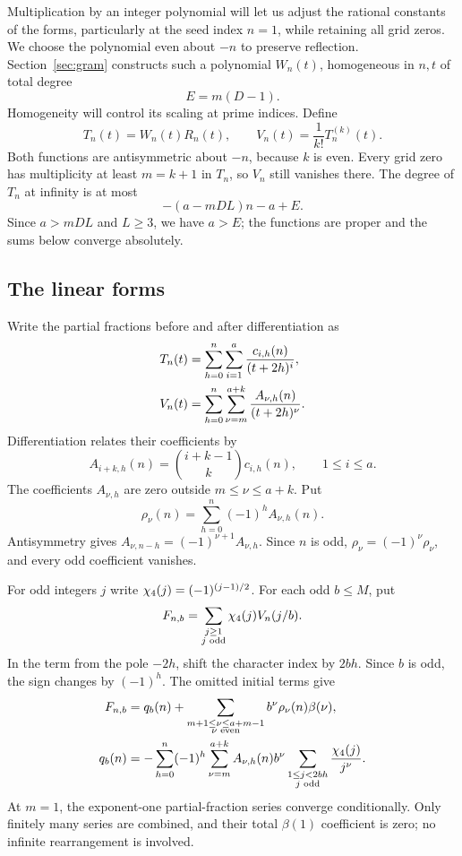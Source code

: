 Multiplication by an integer polynomial will let us adjust the
rational constants of the forms, particularly at the seed index
$n=1$, while retaining all grid zeros. We choose the polynomial
even about $-n$ to preserve reflection.
Section~\ref{sec:gram} constructs such a polynomial $W_n(t)$,
homogeneous in $n,t$ of total degree
\begin{equation}\label{eq:E}
 E=m(D-1).
\end{equation}
Homogeneity will control its scaling at prime indices.
Define
\begin{equation}\label{eq:T-V}
 T_n(t)=W_n(t)R_n(t),\qquad V_n(t)=\frac1{k!}T_n^{(k)}(t).
\end{equation}
Both functions are antisymmetric about $-n$, because $k$ is
even. Every grid zero has multiplicity at least $m=k+1$ in
$T_n$, so $V_n$ still vanishes there. The degree of $T_n$ at
infinity is at most
\[
 -(a-mDL)n-a+E.
\]
Since $a>mDL$ and $L\ge3$, we have $a>E$; the functions are
proper and the sums below converge absolutely.

\subsection{The linear forms}

Write the partial fractions before and after differentiation as
\begin{align}
 T_n(t)&=\sum_{h=0}^n\sum_{i=1}^a
                     \frac{c_{i,h}(n)}{(t+2h)^i},\notag\\
 V_n(t)&=\sum_{h=0}^n\sum_{\nu=m}^{a+k}
                     \frac{A_{\nu,h}(n)}{(t+2h)^\nu}.
 \label{eq:partials}
\end{align}
Differentiation relates their coefficients by
\[
 A_{i+k,h}(n)=\binom{i+k-1}{k}c_{i,h}(n),
 \qquad 1\le i\le a.
\]
The coefficients $A_{\nu,h}$ are zero outside $m\le\nu\le a+k$.
Put
\[
 \rho_\nu(n)=\sum_{h=0}^n(-1)^h A_{\nu,h}(n).
\]
Antisymmetry gives
$A_{\nu,n-h}=(-1)^{\nu+1}A_{\nu,h}$. Since $n$ is odd,
$\rho_\nu=(-1)^\nu\rho_\nu$, and every odd coefficient vanishes.

For odd integers $j$ write $\chi_4(j)=(-1)^{(j-1)/2}$.
For each odd $b\le M$, put
\[
 F_{n,b}=\sum_{\substack{j\ge1\\j\text{ odd}}}\chi_4(j)V_n(j/b).
\]
In the term from the pole $-2h$, shift the character index by
$2bh$. Since $b$ is odd, the sign changes by $(-1)^h$.
The omitted initial terms give
\begin{align}
 F_{n,b}&=q_b(n)+
   \sum_{\substack{m+1\le\nu\le a+m-1\\\nu\text{ even}}}
             b^\nu\rho_\nu(n)\beta(\nu),\label{eq:forms}\\
 q_b(n)&=-\sum_{h=0}^n(-1)^h\sum_{\nu=m}^{a+k}A_{\nu,h}(n)b^\nu
                  \sum_{\substack{1\le j<2bh\\j\text{ odd}}}
                             \frac{\chi_4(j)}{j^\nu}.
 \label{eq:q}
\end{align}
At $m=1$, the exponent-one partial-fraction series converge
conditionally. Only finitely many series are combined, and
their total $\beta(1)$ coefficient is zero; no infinite
rearrangement is involved.


